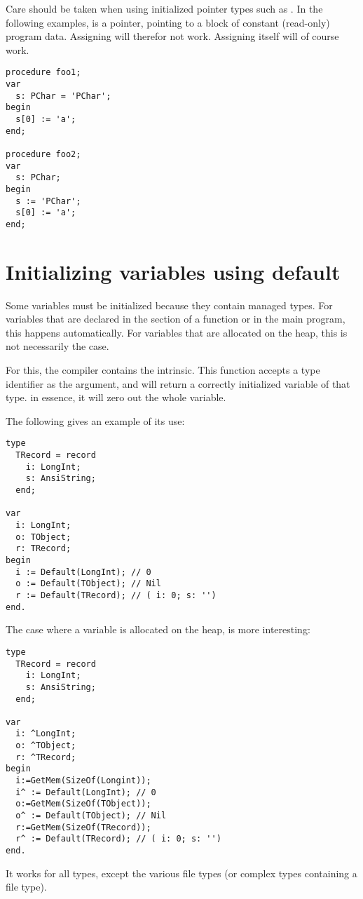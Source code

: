 \begin{remark}
Care should be taken when using initialized pointer types such as . 
In the following examples,  is a pointer, pointing to a block of constant
(read-only) program data.
Assigning  will therefor not work. Assigning  itself will
of course work.
\begin{verbatim}
procedure foo1;
var
  s: PChar = 'PChar';
begin
  s[0] := 'a';
end;
 
procedure foo2;
var
  s: PChar;
begin
  s := 'PChar';
  s[0] := 'a';
end;
\end{verbatim}
\end{remark}

\section{Initializing variables using default}
\label{se:initusingdefault}
Some variables must be initialized because they contain managed types. 
For variables that are declared in the   section of a function or in the main program, this happens automatically.
For variables that are allocated on the heap, this is not necessarily the case.

For this, the compiler contains the  intrinsic. This function accepts a type identifier as the argument, 
and will return a correctly initialized variable of that type. in essence, it will zero out the whole variable.

The following gives an example of its use:
\begin{verbatim}
type
  TRecord = record
    i: LongInt;
    s: AnsiString;
  end;
 
var
  i: LongInt;
  o: TObject;
  r: TRecord;
begin
  i := Default(LongInt); // 0
  o := Default(TObject); // Nil
  r := Default(TRecord); // ( i: 0; s: '')
end.
\end{verbatim}
The case where a variable is allocated on the heap, is more interesting:
\begin{verbatim}
type
  TRecord = record
    i: LongInt;
    s: AnsiString;
  end;
 
var
  i: ^LongInt;
  o: ^TObject;
  r: ^TRecord;
begin
  i:=GetMem(SizeOf(Longint));
  i^ := Default(LongInt); // 0
  o:=GetMem(SizeOf(TObject));
  o^ := Default(TObject); // Nil
  r:=GetMem(SizeOf(TRecord));
  r^ := Default(TRecord); // ( i: 0; s: '')
end.
\end{verbatim}
It works for all types, except the various file types (or complex types containing a file type).

